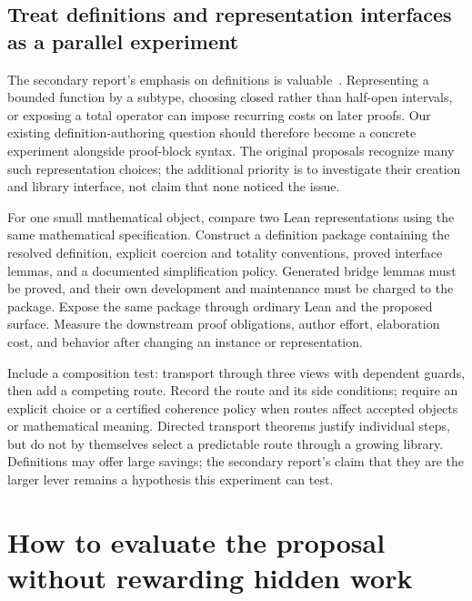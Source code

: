 \documentclass[11pt,letterpaper]{article}
\begin{document}
\subsection{Treat definitions and representation interfaces as a parallel experiment}
The secondary report's emphasis on definitions is valuable~\cite[\S7.6]{secondary}.
Representing a bounded function by a subtype, choosing closed rather than half-open
intervals, or exposing a total operator can impose recurring costs on later proofs.
Our existing definition-authoring question should therefore become a concrete
experiment alongside proof-block syntax. The original proposals recognize many
such representation choices; the additional priority is to investigate their
creation and library interface, not claim that none noticed the issue.

For one small mathematical object, compare two Lean representations using the
same mathematical specification. Construct a definition package containing the
resolved definition, explicit coercion and totality conventions, proved interface
lemmas, and a documented simplification policy. Generated bridge lemmas must be
proved, and their own development and maintenance must be charged to the package.
Expose the same package through ordinary Lean and the proposed surface. Measure
the downstream proof obligations, author effort, elaboration cost, and behavior
after changing an instance or representation.

Include a composition test: transport through three views with dependent guards,
then add a competing route. Record the route and its side conditions; require an
explicit choice or a certified coherence policy when routes affect accepted
objects or mathematical meaning. Directed transport theorems justify individual
steps, but do not by themselves select a predictable route through a growing
library. Definitions may offer large savings; the secondary report's claim that
they are the larger lever remains a hypothesis this experiment can test.

\section{How to evaluate the proposal without rewarding hidden work}\label{sec:evaluation}
\end{document}
